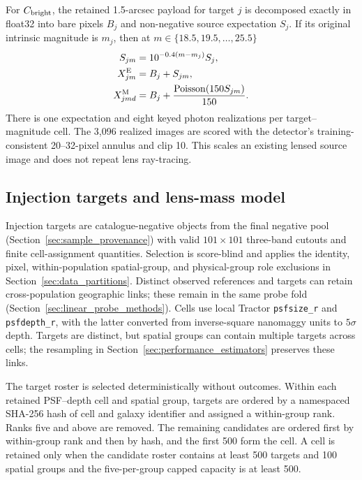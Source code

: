 For \(C_{\rm bright}\), the retained 1.5-arcsec payload for target \(j\) is
decomposed exactly in float32 into bare pixels \(B_j\) and non-negative
source expectation \(S_j\). If its original intrinsic magnitude is \(m_j\),
then at \(m\in\{18.5,19.5,\ldots,25.5\}\)
\begin{equation}
\begin{aligned}
S_{jm}&=10^{-0.4(m-m_j)}S_j,\\
X^{\rm E}_{jm}&=B_j+S_{jm},\\
X^{\rm M}_{jmd}&=B_j+
 \frac{\operatorname{Poisson}(150S_{jm})}{150}.
\end{aligned}
\label{eq:brightness_control}
\end{equation}
There is one expectation and eight keyed photon realizations per
target--magnitude cell. The 3,096 realized images are scored with the
detector's training-consistent 20--32-pixel annulus and clip 10. This scales
an existing lensed source image and does not repeat lens ray-tracing.

\subsection{Injection targets and lens-mass model}
\label{sec:deflector_mass_model}

Injection targets are catalogue-negative objects from the final negative pool
(Section~\ref{sec:sample_provenance}) with valid \(101\times101\)
three-band cutouts and finite cell-assignment quantities. Selection is
score-blind and applies the identity, pixel, within-population spatial-group,
and physical-group role exclusions in Section~\ref{sec:data_partitions}.
Distinct observed references and targets can retain cross-population
geographic links; these remain in the same probe fold
(Section~\ref{sec:linear_probe_methods}). Cells use local Tractor
\texttt{psfsize\_r} and \texttt{psfdepth\_r}, with the latter converted from
inverse-square nanomaggy units to \(5\sigma\) depth. Targets are distinct, but
spatial groups can contain multiple targets across cells; the resampling in
Section~\ref{sec:performance_estimators} preserves these links.

The target roster is selected deterministically without outcomes. Within each
retained PSF--depth cell and spatial group, targets are ordered by a
namespaced SHA-256 hash of cell and galaxy identifier and assigned a
within-group rank. Ranks five and above are removed. The remaining candidates
are ordered first by within-group rank and then by hash, and the first 500
form the cell. A cell is retained only when the candidate roster contains at
least 500 targets and 100 spatial groups and the five-per-group capped
capacity is at least 500.

